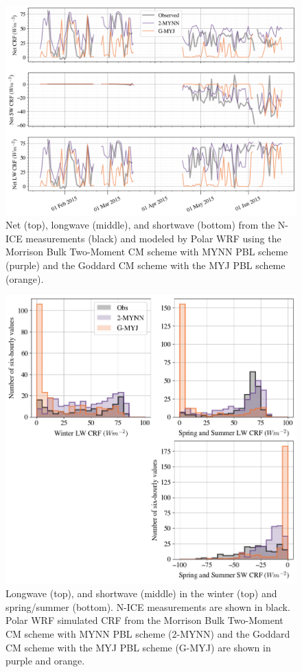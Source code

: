 \begin{figure}[t]
    \centering
    \includegraphics[width=1\linewidth]{figures/chapter4/CRF_TS.png}
    \caption[Time series of cloud radiative forcing in two WRF model runs.]{Net (top), longwave (middle), and shortwave (bottom) from the N-ICE measurements (black) and modeled by Polar WRF using the Morrison Bulk Two-Moment CM scheme with MYNN PBL scheme (purple) and the Goddard CM scheme with the MYJ PBL scheme (orange).}
    \label{fig:wrf_crf_all}
\end{figure}
\begin{figure}[p!]
    \centering
    \includegraphics[width=1\linewidth]{figures/chapter4/CRF_Histos.png}
    \caption[Histograms of cloud radiative forcing in two WRF model runs.]{Longwave (top), and shortwave (middle) in the winter (top) and spring/summer (bottom). N-ICE measurements  are shown in black. Polar WRF simulated CRF from the Morrison Bulk Two-Moment CM scheme with MYNN PBL scheme (2-MYNN) and the Goddard CM scheme with the MYJ PBL scheme (G-MYJ) are shown in purple and orange.}
    \label{wrf:fig_crf_his}
\end{figure}

